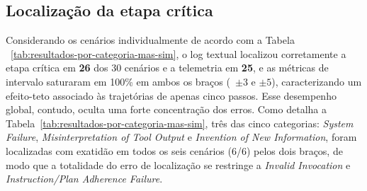 \documentclass[sigconf]{acmart}
\begin{document}
\subsection{Localização da etapa crítica}
\label{subsec:localizacao}

\begin{table}[t]
	\centering
	\caption{Estatísticas descritivas da distância de passo no experimento MAS-SIM. Valores menores indicam melhor localização da etapa crítica.}
	\label{tab:distancia-passo-mas-sim}
\end{table}

Considerando os cenários individualmente de acordo com a Tabela ~\ref{tab:resultados-por-categoria-mas-sim}, o log
textual localizou corretamente a etapa crítica em \textbf{26} dos 30 cenários e a telemetria em \textbf{25}, e as
métricas de intervalo  saturaram em 100\% em ambos os braços (~$\pm 3$ e $\pm 5$),
caracterizando um efeito-teto associado às trajetórias de apenas cinco passos. Esse desempenho global, contudo, oculta
uma forte concentração dos erros. Como detalha a Tabela~\ref{tab:resultados-por-categoria-mas-sim}, três das cinco
categorias: \textit{System Failure}, \textit{Misinterpretation of Tool Output} e \textit{Invention of New Information},
foram localizadas com exatidão em todos os seis cenários (6/6) pelos dois braços, de modo que a totalidade do erro de
localização se restringe a \textit{Invalid Invocation} e \textit{Instruction/Plan Adherence Failure}.
\end{document}
